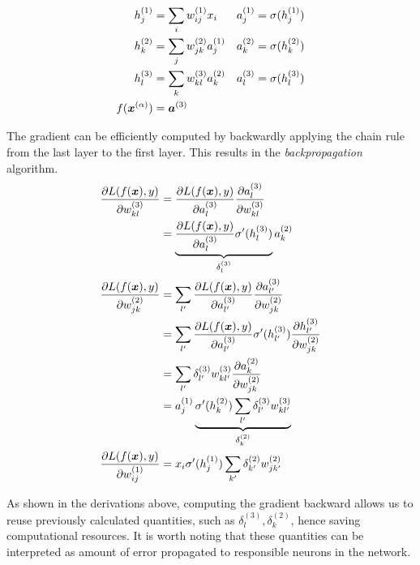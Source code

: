 \begin{align*}
		h_j^{(1)} &= \sum_i w_{ij}^{(1)} x_i & a_j^{(1)} &= \sigma (h_j^{(1)})	\\
		h_k^{(2)} &= \sum_j w_{jk}^{(2)} a_j^{(1)}  & a_k^{(2)} &= \sigma (h_k^{(2)})	 \\
		h_l^{(3)} &= \sum_k w_{kl}^{(3)} a_k^{(2)} & a_l^{(3)} &= \sigma (h_l^{(3)})	 \\
		f(\xa) &= \boldsymbol{a}^{(3)}
\end{align*}


The gradient can be efficiently computed by backwardly applying the chain rule from the last layer to the first layer. This results in the \textit{backpropagation} algorithm.
\begin{align*}
	\frac{\partial L(f(\boldsymbol{x}), y)  }{\partial w_{k  l}^{(3)} } &= 	\frac{\partial L(f(\boldsymbol{x}), y) }{\partial a_{l}^{(3)} }  \frac{\partial a_{l}^{(3)} }{\partial w_{k  l}^{(3)} }  	\\
		&= 	\underbrace{\frac{\partial L(f(\boldsymbol{x}), y) }{\partial a_{l}^{(3)} } \sigma'(h_l^{(3)})}_{ \delta_l^{(3)}} a_{k}^{(2)} 	\\
	\frac{\partial L(f(\boldsymbol{x}), y)  }{\partial w_{j  k}^{(2)} } 
		&=  \sum_{l'} 	\frac{\partial L(f(\boldsymbol{x}), y) }{\partial a_{l'}^{(3)} } \frac{\partial a_{l'}^{(3)}}{\partial w_{j  k}^{(2)}} \\
		&= \sum_{l'} 	\frac{\partial L(f(\boldsymbol{x}), y) }{\partial a_{l'}^{(3)} } \sigma'(h_{l'}^{(3)})  \frac{\partial h_{l'}^{(3)} }{\partial w_{j  k}^{(2)}} \\
		&= \sum_{l'} 	\delta_{l'}^{(3)}  w_{k  l'}^{(3)} \frac{\partial a_{k}^{(2)} }{\partial w_{j  k}^{(2)}} \\
		&= a_{j}^{(1)}  \underbrace{\sigma'(h_{k}^{(2)}) \sum_{l'}\delta_{l'}^{(3)} w_{k  l'}^{(3)}}_{\delta_{k}^{(2)}}  \\
	\frac{\partial L(f(\boldsymbol{x}), y)  }{\partial w_{i  j}^{(1)} } &=  x_i  \sigma'(h_{j}^{(1)}) \sum_{k'} 	\delta_{k'}^{(2)} w_{j  k'}^{(2)} 
\end{align*}

As shown in the derivations above, computing the gradient backward allows us to reuse previously calculated quantities, such as $\delta_l^{(3)}, \delta_{k}^{(2)}$, hence saving computational resources.  It is worth noting that these  quantities can be interpreted as amount of error propagated to responsible neurons in the network.

